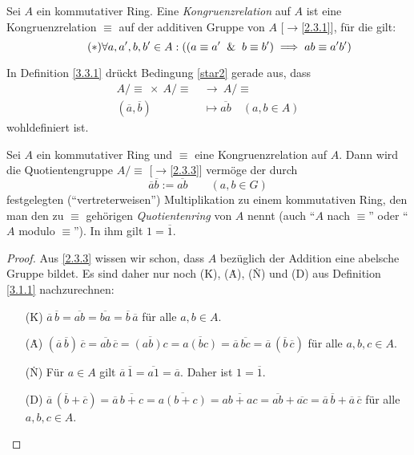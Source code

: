 \documentclass[../../main.tex]{subfiles}
\begin{document}
\begin{df} \label{3.3.1}
Sei $A$ ein kommutativer Ring. Eine \emph{Kongruenzrelation} auf $A$ ist eine Kongruenzrelation $\equiv$ auf der additiven Gruppe von $A$
[$\to$\ref{2.3.1}], für die gilt:
\begin{equation}\tag{$*$}\label{star2}
\forall a,a',b,b'\in A:((a\equiv a' ~\mathbin{\&}~ b\equiv b')\implies ab\equiv a'b')
\end{equation}
\end{df}

\begin{bem}\label{3.3.2}
In Definition \ref{3.3.1} drückt Bedingung \eqref{star2} gerade aus, dass
\begin{align*}
A/\mbox{$\equiv$}~\times~A/\mbox{$\equiv$}~&\to~A/\mbox{$\equiv$}\\
(\overline a,\overline b)&\mapsto\overline{ab}\quad(a,b\in A)
\end{align*}
wohldefiniert ist.
\end{bem}

\begin{satdef}\label{3.3.3}
Sei $A$ ein kommutativer Ring und $\equiv$ eine Kongruenzrelation auf $A$. Dann wird die Quotientengruppe $A/\mbox{$\equiv$}$ {\rm[$\to$\ref{2.3.3}]} vermöge der durch
$$\overline a\overline b:=\overline{ab}\qquad(a,b\in G)$$
festgelegten ("`vertreterweisen"') Multiplikation zu einem kommutativen Ring, den man den zu $\equiv$ gehörigen \emph{Quotientenring} von $A$
nennt (auch "`$A$ nach $\equiv$"' oder "`$A$ modulo $\equiv$"'). In ihm gilt $1=\overline1$.
\end{satdef}

\begin{proof}
Aus \ref{2.3.3} wissen wir schon, dass $A$ bezüglich der Addition eine abelsche Gruppe bildet. Es sind daher nur noch (\.K), (\.A), (\.N) und (D) aus Definition \ref{3.1.1} nachzurechnen:
\begin{enumerate}
\item[(\.K)] $\overline a\,\overline b=\overline{ab}=\overline{ba}=\overline b\,\overline a$ für alle $a,b\in A$.
\item[(\.A)]  $(\overline a\,\overline b)\,\overline c=\overline{ab}\,\overline c=\overline{(ab)c}=\overline{a(bc)}=\overline a\,\overline{bc}=
\overline a\,(\overline b\,\overline c)$ für alle $a,b,c\in A$.
\item[(\.N)] Für $a\in A$ gilt $\overline a\,\overline1=\overline{a1}=\overline a$. Daher ist $1=\overline 1$.
\item[(D)] $\overline a\,(\overline b+\overline c)=\overline{a}\,\overline{b+c}=\overline{a(b+c)}=\overline{ab+ac}=\overline{ab}+\overline{ac}=\overline a\,\overline b+\overline a\,\overline c$ für alle $a,b,c\in A$.
\end{enumerate}
\end{proof}
\end{document}
